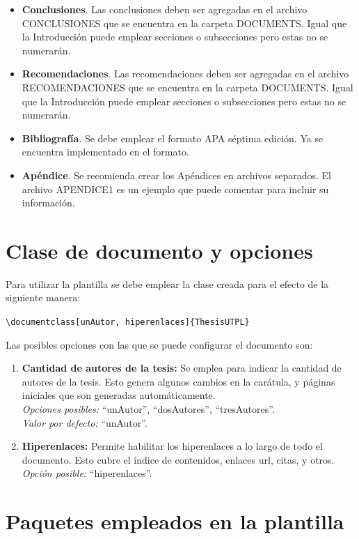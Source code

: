 \begin{itemize}
	\item \textbf{Conclusiones}. Las conclusiones deben ser agregadas en el archivo CONCLUSIONES que se encuentra en la carpeta DOCUMENTS. Igual que la Introducción puede emplear secciones o subsecciones pero estas no se numerarán.  
	\item \textbf{Recomendaciones}. Las recomendaciones deben ser agregadas en el archivo RECOMENDACIONES que se encuentra en la carpeta DOCUMENTS. Igual que la Introducción puede emplear secciones o subsecciones pero estas no se numerarán.   	
	\item \textbf{Bibliografía}. Se debe emplear el formato APA séptima edición. Ya se encuentra implementado en el formato. 
	\item \textbf{Apéndice}. Se recomienda crear los Apéndices en archivos separados. El archivo APENDICE1 es un ejemplo que puede comentar para incluir su información.   
\end{itemize}

\section{Clase de documento y opciones}

Para utilizar la plantilla se debe emplear la clase creada para el efecto de la siguiente manera: 

\lstinline|\documentclass[unAutor, hiperenlaces]{ThesisUTPL}| 

Las posibles opciones con las que se puede configurar el documento son: 

\begin{enumerate}
	\item \textbf{Cantidad de autores de la tesis:} Se emplea para indicar la cantidad de autores de la tesis. Esto genera algunos cambios en la carátula, y páginas iniciales que son generadas automáticamente. \\
	\textit{Opciones posibles:} ``unAutor'', ``dosAutores'', ``tresAutores''. \\
	\textit{Valor por defecto:} ``unAutor''.
	\item \textbf{Hiperenlaces:} Permite habilitar los hiperenlaces a lo largo de todo el documento. Esto cubre el índice de contenidos, enlaces url, citas, y otros. \\
	\textit{Opción posible:} ``hiperenlaces''. 
	
\end{enumerate}

\section{Paquetes empleados en la plantilla}

